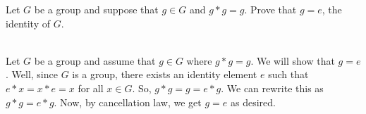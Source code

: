 Let $G$ be a group and suppose that $g\in G$ and $g*g=g$. Prove that $g=e$, the identity of $G$.\\

\begin{solution}\renewcommand{\qedsymbol}{}\ \\
    Let $G$ be a group and assume that $g\in G$ where $g*g=g$. We will show that $g=e$. Well, since $G$
    is a group, there exists an identity element $e$ such that $e*x=x*e=x$ for all $x\in G$. So,
    $g*g=g=e*g$. We can rewrite this as $g*g=e*g$. Now, by cancellation law, we get $g=e$ as desired.

\end{solution}